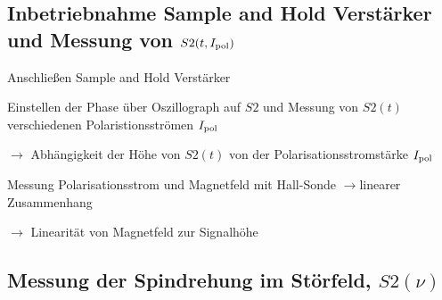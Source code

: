 \documentclass[paper=a4,
	fontsize=10pt,
	DIV=18,
	twocolumn,
	parskip=half
	]{scrartcl}
\numberwithin{equation}{section}    %
\newcommand{\tra}{$\rightarrow$}
\begin{document}
\subsection{Inbetriebnahme Sample and Hold Verstärker und Messung von $S2(t,I_{\rm pol})$}
\label{vorbereitung4}

\begin{compactitem}
	\item Anschließen Sample and Hold Verstärker
	\item Einstellen der Phase über Oszillograph auf $S2$ und Messung von $S2(t)$ verschiedenen Polaristionsströmen $I_{\rm pol}$
	\item[\tra] Abhängigkeit der Höhe von $S2(t)$ von der Polarisationsstromstärke $I_{\rm pol}$
	\item Messung Polarisationsstrom und Magnetfeld mit Hall-Sonde \tra linearer Zusammenhang
	\item[\tra] Linearität von Magnetfeld zur Signalhöhe
\end{compactitem}
\subsection{Messung der Spindrehung im Störfeld, $S2(\nu)$}
\label{vorbereitung5}
\end{document}
